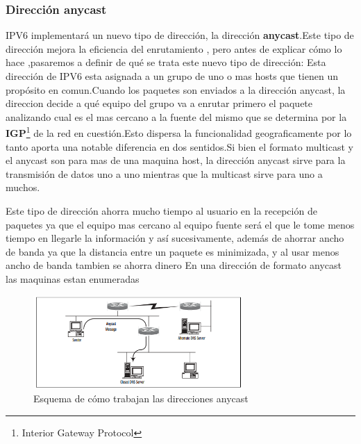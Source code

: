 \documentclass[11pt,a4paper]{article}
\begin{document}
\subsubsection{Dirección anycast}
\par IPV6 implementará un nuevo tipo de dirección, la dirección \textbf{anycast}.Este tipo de dirección mejora la eficiencia del enrutamiento , pero antes de explicar cómo lo hace ,pasaremos a definir de qué se trata este nuevo tipo de dirección:
Esta dirección de IPV6  esta asignada a un grupo de uno o mas hosts que tienen un propósito en comun.Cuando los paquetes son enviados a la dirección anycast, la direccion decide a qué equipo del grupo  va a enrutar primero el paquete analizando cual es el mas cercano a la fuente del mismo que se determina por la \textbf{IGP}\footnote{Interior Gateway Protocol} de la red en cuestión.Esto dispersa la funcionalidad geograficamente por lo tanto aporta una notable diferencia en dos sentidos.Si bien el formato multicast y el anycast son para mas de una maquina host, la dirección anycast sirve para la transmisión de datos uno a uno mientras que la multicast sirve para uno a muchos.
\par Este tipo de dirección ahorra mucho tiempo al usuario en la recepción de paquetes ya que el equipo mas cercano al equipo fuente será el que le tome menos tiempo en llegarle la información y así sucesivamente, además de ahorrar ancho de banda ya que la distancia entre un paquete  es minimizada, y al usar menos ancho de banda tambien se ahorra dinero
En una dirección de formato anycast las maquinas estan enumeradas
\begin{figure}[h!]
 \centering
 \includegraphics[width=0.71\textwidth]{anycast.png}
 \caption[Esquema anycast]{Esquema de cómo trabajan las direcciones anycast}
\end{figure} \par
\end{document}
